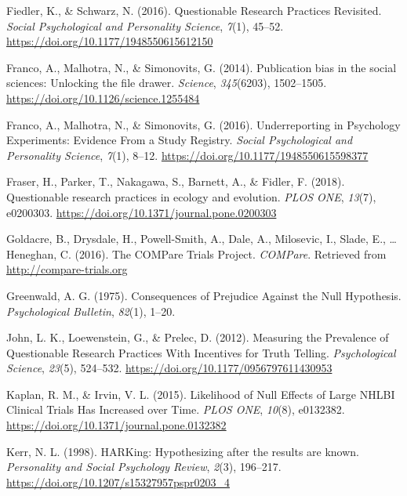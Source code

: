 \documentclass[british,,jou,floatsintext]{apa6}
\begin{document}
\leavevmode\hypertarget{ref-Fiedler2016}{}%
Fiedler, K., \& Schwarz, N. (2016). Questionable Research Practices Revisited. \emph{Social Psychological and Personality Science}, \emph{7}(1), 45--52. \url{https://doi.org/10.1177/1948550615612150}

\leavevmode\hypertarget{ref-Franco2014}{}%
Franco, A., Malhotra, N., \& Simonovits, G. (2014). Publication bias in the social sciences: Unlocking the file drawer. \emph{Science}, \emph{345}(6203), 1502--1505. \url{https://doi.org/10.1126/science.1255484}

\leavevmode\hypertarget{ref-Franco2016}{}%
Franco, A., Malhotra, N., \& Simonovits, G. (2016). Underreporting in Psychology Experiments: Evidence From a Study Registry. \emph{Social Psychological and Personality Science}, \emph{7}(1), 8--12. \url{https://doi.org/10.1177/1948550615598377}

\leavevmode\hypertarget{ref-Fraser2018}{}%
Fraser, H., Parker, T., Nakagawa, S., Barnett, A., \& Fidler, F. (2018). Questionable research practices in ecology and evolution. \emph{PLOS ONE}, \emph{13}(7), e0200303. \url{https://doi.org/10.1371/journal.pone.0200303}

\leavevmode\hypertarget{ref-Goldacre2016}{}%
Goldacre, B., Drysdale, H., Powell-Smith, A., Dale, A., Milosevic, I., Slade, E., \ldots{} Heneghan, C. (2016). The COMPare Trials Project. \emph{COMPare}. Retrieved from \url{http://compare-trials.org}

\leavevmode\hypertarget{ref-Greenwald1975}{}%
Greenwald, A. G. (1975). Consequences of Prejudice Against the Null Hypothesis. \emph{Psychological Bulletin}, \emph{82}(1), 1--20.

\leavevmode\hypertarget{ref-John2012}{}%
John, L. K., Loewenstein, G., \& Prelec, D. (2012). Measuring the Prevalence of Questionable Research Practices With Incentives for Truth Telling. \emph{Psychological Science}, \emph{23}(5), 524--532. \url{https://doi.org/10.1177/0956797611430953}

\leavevmode\hypertarget{ref-Kaplan2015}{}%
Kaplan, R. M., \& Irvin, V. L. (2015). Likelihood of Null Effects of Large NHLBI Clinical Trials Has Increased over Time. \emph{PLOS ONE}, \emph{10}(8), e0132382. \url{https://doi.org/10.1371/journal.pone.0132382}

\leavevmode\hypertarget{ref-Kerr1998}{}%
Kerr, N. L. (1998). HARKing: Hypothesizing after the results are known. \emph{Personality and Social Psychology Review}, \emph{2}(3), 196--217. \url{https://doi.org/10.1207/s15327957pspr0203_4}
\end{document}
